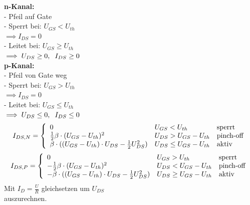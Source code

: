 \documentclass[8pt]{extarticle}
\begin{document}
\begin{minipage}{0.33\textwidth}
\textbf{n-Kanal:}\\
- Pfeil auf Gate\\
- Sperrt bei: $U_{GS} < U_{th}$\\
\phantom{sssi} $\implies I_{DS} = 0$\\
- Leitet bei: $U_{GS} \geq U_{th}$ \\
\phantom{sssi} $\implies U_{DS} \geq 0, \hspace{2mm} I_{DS} \geq 0$\\
%
\textbf{p-Kanal:}\\
- Pfeil von Gate weg\\
- Sperrt bei: $U_{GS} > U_{th}$\\
\phantom{sssi} $\implies I_{DS} = 0$\\
- Leitet bei: $U_{GS} \leq U_{th}$ \\
\phantom{sssi} $\implies U_{DS} \leq 0, \hspace{2mm} I_{DS} \leq 0$
%
\[
  I_{DS,N} = \left\{
  \begin{array}{lll}
        0 & U_{GS} < U_{th} &$sperrt$ \\
        \frac{1}{2} \beta \cdot(U_{GS} - U_{th})^2 & U_{DS} > U_{GS} - U_{th} & $pinch-off$ \\
        \beta \cdot((U_{GS} - U_{th}) \cdot U_{DS} - \frac{1}{2} U_{DS}^2) & U_{DS} \leq U_{GS} - U_{th} & $aktiv$\\
  \end{array}
\right.
\]
\[
  I_{DS,P} = \left\{
  \begin{array}{lll}
        0 & U_{GS} > U_{th} &$sperrt$ \\
        -\frac{1}{2} \beta \cdot(U_{GS} - U_{th})^2 & U_{DS} < U_{GS} - U_{th} & $pinch-off$ \\
        -\beta \cdot((U_{GS} - U_{th}) \cdot U_{DS} - \frac{1}{2} U_{DS}^2) & U_{DS} \geq U_{GS} - U_{th} & $aktiv$\\
  \end{array}
\right.
\]
Mit $I_D = \frac{U}{R}$ gleichsetzen um $U_{DS}$\\
auszurechnen. \\


\end{minipage}
\end{document}
